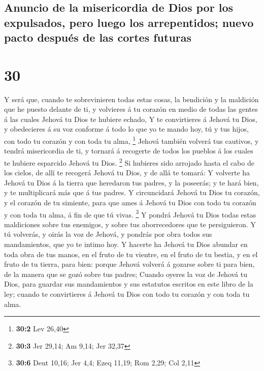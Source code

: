 \hypertarget{anuncio-de-la-misericordia-de-dios-por-los-expulsados-pero-luego-los-arrepentidos-nuevo-pacto-despuuxe9s-de-las-cortes-futuras}{%
\subsection{Anuncio de la misericordia de Dios por los expulsados, pero
luego los arrepentidos; nuevo pacto después de las cortes
futuras}\label{anuncio-de-la-misericordia-de-dios-por-los-expulsados-pero-luego-los-arrepentidos-nuevo-pacto-despuuxe9s-de-las-cortes-futuras}}

\hypertarget{section-29}{%
\section{30}\label{section-29}}

 Y será que, cuando te sobrevinieren todas estas cosas, la
bendición y la maldición que he puesto delante de ti, y volvieres á tu
corazón en medio de todas las gentes á las cuales Jehová tu Dios te
hubiere echado,  Y te convirtieres á Jehová tu Dios, y
obedecieres á su voz conforme á todo lo que yo te mando hoy, tú y tus
hijos, con todo tu corazón y con toda tu alma, \footnote{\textbf{30:2}
  Lev 26,40}  Jehová también volverá tus cautivos, y tendrá
misericordia de ti, y tornará á recogerte de todos los pueblos á los
cuales te hubiere esparcido Jehová tu Dios. \footnote{\textbf{30:3} Jer
  29,14; Am 9,14; Jer 32,37}  Si hubieres sido arrojado
hasta el cabo de los cielos, de allí te recogerá Jehová tu Dios, y de
allá te tomará:  Y volverte ha Jehová tu Dios á la tierra
que heredaron tus padres, y la poseerás; y te hará bien, y te
multiplicará más que á tus padres.  Y circuncidará Jehová tu
Dios tu corazón, y el corazón de tu simiente, para que ames á Jehová tu
Dios con todo tu corazón y con toda tu alma, á fin de que tú vivas.
\footnote{\textbf{30:6} Deut 10,16; Jer 4,4; Ezeq 11,19; Rom 2,29; Col
  2,11}  Y pondrá Jehová tu Dios todas estas maldiciones
sobre tus enemigos, y sobre tus aborrecedores que te persiguieron.
 Y tú volverás, y oirás la voz de Jehová, y pondrás por obra
todos sus mandamientos, que yo te intimo hoy.  Y hacerte ha
Jehová tu Dios abundar en toda obra de tus manos, en el fruto de tu
vientre, en el fruto de tu bestia, y en el fruto de tu tierra, para
bien: porque Jehová volverá á gozarse sobre ti para bien, de la manera
que se gozó sobre tus padres;  Cuando oyeres la voz de
Jehová tu Dios, para guardar sus mandamientos y sus estatutos escritos
en este libro de la ley; cuando te convirtieres á Jehová tu Dios con
todo tu corazón y con toda tu alma.


